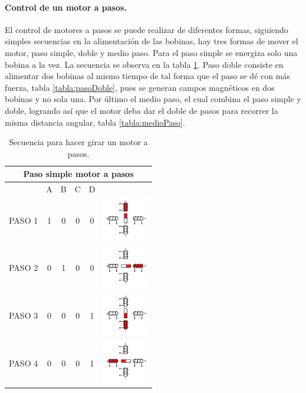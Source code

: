 \paragraph{Control de un motor a pasos.}
El control de motores a pasos se puede realizar de diferentes formas, siguiendo simples secuencias en la alimentación de las bobinas, hay tres formas de mover el motor, paso simple, doble y medio paso. Para el paso simple se energiza solo una bobina a la vez. La secuencia se observa en la tabla \ref{tabla:SecuenciaSimple}. Paso doble consiste en alimentar dos bobinas al mismo tiempo de tal forma que el paso se dé con más fuerza, tabla \ref{tabla:pasoDoble}, pues se generan campos magnéticos en dos bobinas y no sola una. Por último el medio paso, el cual combina el paso simple y doble, logrando así que el motor deba dar el doble de pasos para recorrer la misma distancia angular, tabla \ref{tabla:medioPaso}.
\begin{table}
\centering
\caption{Secuencia para hacer girar un motor a pasos. \cite{BasicStepper}}
\label{tabla:SecuenciaSimple}
\begin{tabular}{|c|c|c|c|c|c|}
	\hline 
	\multicolumn{6}{|c|}{Paso simple motor a pasos} \\ 
	\hline 
	& \hspace{5mm} A \hspace{5mm} & \hspace{5mm} B \hspace{5mm} & \hspace{5mm} C \hspace{5mm} & \hspace{5mm} D \hspace{5mm} & \\ 
	\hline 
	PASO 1  & 1 & 0 & 0 & 0 &\includegraphics[width=20mm]{Imagenes/2/paso1} \\ 
	\hline 
	PASO 2 & 0 & 1 & 0 & 0 & \includegraphics[width=20mm]{Imagenes/2/paso2} \\ 
	\hline 
	PASO 3 & 0 & 0 & 0 & 1 & \includegraphics[width=20mm]{Imagenes/2/paso3} \\ 
	\hline 
	PASO 4 & 0 & 0 & 0 & 1 & \includegraphics[width=20mm]{Imagenes/2/paso4} \\ 
	\hline 
\end{tabular} 
\end{table}

